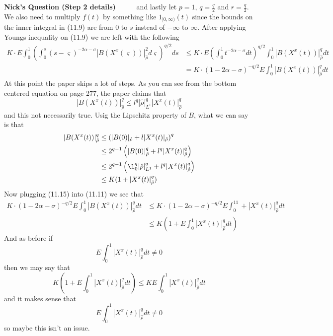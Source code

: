 \documentclass[a4paper,11pt]{article}
\theoremstyle{plain}
\theoremstyle{definition}
\newcounter{NQ}
\newenvironment{NickQuestion}[1][] %
  {\refstepcounter{NQ}
  \begin{mdframed}[backgroundcolor=lightgray]\textbf{Nick's Question \theNQ \: #1~~}~~~\noindent}%
  {\end{mdframed}}
\numberwithin{NQ}{section}
\numberwithin{LQ}{section}
\numberwithin{ZQ}{section}
\begin{document}
\begin{NickQuestion}[(Step 2 details)]
and lastly let $p=1$, $q=\frac{q}{2}$ and $r=\frac{q}{2}$. We also need to multiply $f(t)$ by something like $1_{[0,\infty)}(t)$ since the bounds on the inner integral in (11.9) are from $0$ to $s$ instead of $-\infty$ to $\infty$. After applying Youngs inequality on (11.9) we are left with the following 
\begin{align}
    K \cdot E\int_0^1\left(\int_0^s(s-\varsigma)^{-2\alpha-\sigma}|B(X^x(\varsigma))|_{\hat\rho}^2d\varsigma\right)^{q/2} ds &\le K\cdot E \left(\int_0^1 t^{-2\alpha - \sigma}dt\right)^{q/2}  \int_0^1|B(X^x(t))|_{\hat\rho}^q dt
    \\ &=K\cdot(1-2\alpha - \sigma)^{-q/2} E \int_0^1|B(X^x(t))|_{\hat\rho}^q dt
\end{align}
At this point the paper skips a lot of steps. As you can see from the bottom centered equation on page 277, the paper claims that $$ |B(X^x(t))|_{\hat\rho}^q \le l^q|\hat\rho|_{L^1}^q|X^x(t)|_{\hat\rho}^q $$ and this not necessarily true. Usig the Lipschitz property of $B$, what we can say is that 
\begin{align} |B(X^x(t))|_{\hat\rho}^q &\le \left(|B(0)|_{\hat\rho}+l|X^x(t)|_{\hat\rho} \right)^q
\\ &\le 2^{q-1}\left(|B(0)|_{\hat\rho}^q + l^q|X^x(t)|_{\hat\rho}^q  \right)
\\ &\le 2^{q-1}\left(\l_0^q|\hat\rho|_{L^1}^q + l^q|X^x(t)|_{\hat\rho}^q  \right)
\\ &\le K(1+|X^x(t)|_{\hat\rho}^q)
\end{align} 
Now plugging (11.15) into (11.11) we see that 
\begin{align}
    K\cdot(1-2\alpha - \sigma)^{-q/2} E \int_0^1|B(X^x(t))|_{\hat\rho}^q dt &\le K\cdot(1-2\alpha - \sigma)^{-q/2} E \int_0^11+|X^x(t)|_{\hat\rho}^q dt 
    \\ &\le K\left(1+E\int_0^1|X^x(t)|_{\hat\rho}^q dt \right)
\end{align}
And as before if $$E\int_0^1|X^x(t)|_{\hat\rho}^q dt \not = 0$$ then we may say that $$ K\left(1+E\int_0^1|X^x(t)|_{\hat\rho}^q dt \right) \le K E\int_0^1|X^x(t)|_{\hat\rho}^q dt  $$ 
and it makes sense that $$E\int_0^1|X^x(t)|_{\hat\rho}^q dt \not = 0$$ so maybe this isn't an issue.  
\end{NickQuestion}
 
\end{document}
